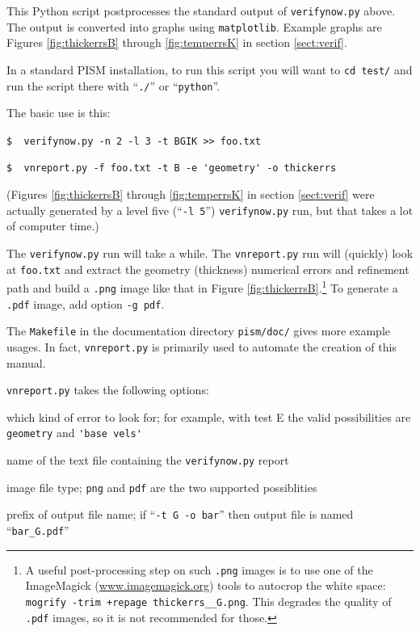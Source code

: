 \documentclass[11pt,final]{amsart}
\newcommand{\und}{\_\!\_}
\begin{document}
  This Python script postprocesses the standard output of \verb|verifynow.py| above.  The output is converted into graphs using \verb|matplotlib|.  Example graphs are Figures \ref{fig:thickerrsB} through \ref{fig:temperrsK} in section \ref{sect:verif}.

In a standard PISM installation, to run this script you will want to \verb|cd test/| and run the script there with ``\verb|./|'' or ``\verb|python|''.

The basic use is this:

\verb|$  verifynow.py -n 2 -l 3 -t BGIK >> foo.txt|

\verb|$  vnreport.py -f foo.txt -t B -e 'geometry' -o thickerrs|

\noindent (Figures \ref{fig:thickerrsB} through \ref{fig:temperrsK} in section \ref{sect:verif} were actually generated by a level five (``\verb|-l 5|'') \verb|verifynow.py| run, but that takes a lot of computer time.)

The \verb|verifynow.py| run will take a while.  The \verb|vnreport.py| run will (quickly) look at \verb|foo.txt| and extract the geometry (thickness) numerical errors and refinement path and build a \verb|.png| image like that in Figure \ref{fig:thickerrsB}.\footnote{A useful post-processing step on such \texttt{.png} images is to use one of the ImageMagick (\href{http://www.imagemagick.org/}{www.imagemagick.org}) tools to autocrop the white space: \texttt{mogrify -trim +repage thickerrs\und G.png}.  This degrades the quality of \texttt{.pdf} images, so it is not recommended for those.}  To generate a \verb|.pdf| image, add option \verb|-g pdf|.

The \verb|Makefile| in the documentation directory \verb|pism/doc/| gives more example usages.  In fact, \verb|vnreport.py| is primarily used to automate the creation of this manual.

\opthead  \verb|vnreport.py| takes the following options:

 which kind of error to look for; for example, with test E the valid possibilities are \verb|geometry| and \verb|'base vels'|

 name of the text file containing the \verb|verifynow.py| report

 image file type; \verb|png| and \verb|pdf| are the two supported possiblities

 prefix of output file name; if ``\verb|-t G -o bar|'' then output file is named ``\verb|bar_G.pdf|''
\end{document}
